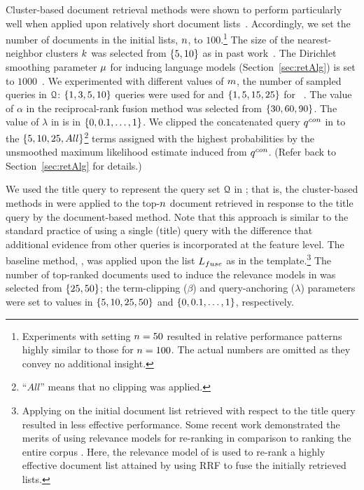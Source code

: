 Cluster-based document retrieval methods were shown to perform particularly well when applied upon relatively short document lists~\cite{Raiber+Kurland:13a}. Accordingly, we set the number of documents in the initial lists, $n$, to $100$.\footnote{Experiments with setting $n=50$ resulted in relative performance patterns highly similar to those for $n=100$. The actual numbers are omitted as they convey no additional insight.} The size of the nearest-neighbor clusters $k$ was selected from $\{5,10\}$ as in past work~\cite{Kurland+Domshlak:08a,Kurland:09a,Kurland+Krikon:11a,Raiber+Kurland:13a}. The Dirichlet smoothing parameter $\mu$ for inducing language models (Section~\ref{sec:retAlg}) is set to $1000$~\cite{Zhai+Lafferty:01a}.
We experimented with different values of $m$, the number of sampled queries in ${\mathcal Q}$: $\{1,3,5,10\}$ queries were used for \robust and $\{1,5,15,25\}$ for \cw~\cite{Lu+al:19a}.
The value of $\alpha$ in the reciprocal-rank fusion method was selected from $\{30,60,90\}$. The value of $ \lambda$ in \interp is in $\{0,0.1,\ldots,1\}$.
We clipped the concatenated query $q^{con}$ in \queryCat to the $\{5,10,25,All\}$\footnote{``$All$'' means that no clipping was applied.} terms assigned with the highest probabilities by the unsmoothed maximum likelihood estimate induced from $q^{con}$. (Refer back to Section~\ref{sec:retAlg} for details.)

We used the title query to represent the query set ${\mathcal Q}$ in \feature; that is, the cluster-based methods in \feature were applied to the top-$n$ document retrieved in response to the title query by the document-based method.
Note that this approach is similar to the standard practice of using a single (title) query with the difference that additional evidence from other queries is incorporated at the feature level.
The baseline method, \ariRM, was applied upon the list
$L_{fuse}$ as in the \fuseClust template.\footnote{Applying
  \ariRM on the initial document list retrieved with respect to the
  title query resulted in less effective performance. Some recent work demonstrated the merits of using relevance models for re-ranking in comparison to ranking the entire corpus \cite{Diaz:15a}. Here, the relevance model of \ariRM is used to re-rank a highly effective document list attained by using RRF to fuse the initially retrieved lists.}  The number of
top-ranked documents used to induce the relevance models in \ariRM was
selected from $\{25,50\}$; the term-clipping ($\beta$) and
query-anchoring ($\lambda$) parameters were set to values in
$\{5,10,25,50\}$ and $\{0,0.1,\ldots,1\}$, respectively.


